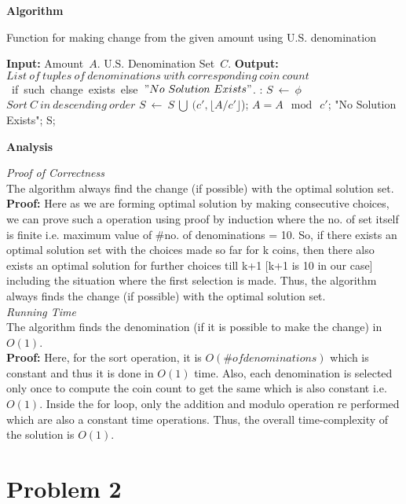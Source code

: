 \documentclass{article}
\begin{document}
\textbf{Algorithm}
\begin{algorithm}
\caption{Function for making change from the given amount using U.S. denomination}
\label{alg:main}
\begin{algorithmic}[1]
\State \textbf{Input:} Amount\ $A$. U.S. Denomination Set\ $C$.
\State \textbf{Output:} $List\ of\ tuples\ of\ denominations\ with\ corresponding\ coin\ count$\ if\ such\ change\ exists\ else\ $"No\ Solution\ Exists"$.
:
\State $S\ \leftarrow\ \phi$
\State $Sort\ C\ in\ descending\ order$
\State $S\ \leftarrow\ S\ \bigcup\ (c', \lfloor A/c' \rfloor$);
\State $A = A\ \bmod\ c'$;
\EndFor
{}
\State \Return "No Solution Exists";
\EndIf
\State \Return S;
\EndFunction
\end{algorithmic}
\end{algorithm}
\clearpage
\textbf{Analysis}

\textit{Proof of Correctness}\\
The algorithm always find the change (if possible) with the optimal solution set.\\
\textbf{Proof:} Here as we are forming optimal solution by making consecutive choices, we can prove such a operation using proof by induction where the no. of set itself is finite i.e. maximum value of \#no. of denominations = 10. So, if there exists an optimal solution set with the choices made so far for k coins, then there also exists an optimal solution for further choices till k+1 [k+1 is 10 in our case] including the situation where the first selection is made. Thus, the algorithm always finds the change (if possible) with the optimal solution set.\\

\textit{Running Time}\\ The algorithm finds the denomination (if it is possible to make the change) in $O(1)$.\\
\textbf{Proof:} Here, for the sort operation, it is $O(\# of denominations)$ which is constant and thus it is done in $O(1)$ time. Also, each denomination is selected only once to compute the coin count to get the same which is also constant i.e. $O(1)$. Inside the for loop, only the addition and modulo operation re performed which are also a constant time operations. Thus, the overall time-complexity of the solution is $O(1)$.

\section*{Problem 2}
\end{document}
